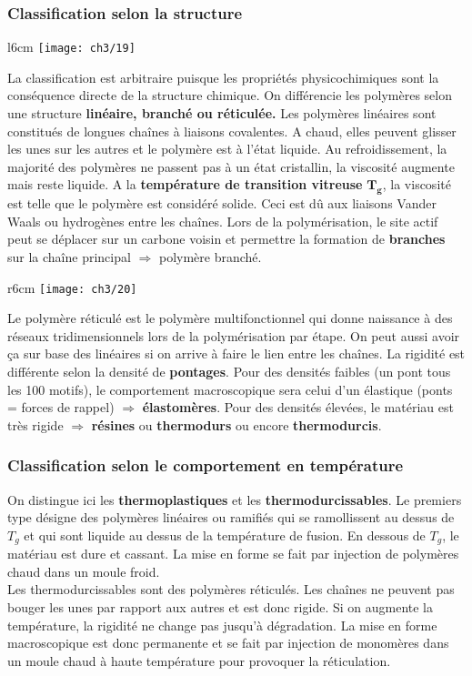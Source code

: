 	\subsubsection{Classification selon la structure}
	\begin{wrapfigure}[8]{l}{6cm}
			\vspace{-5mm}
			\texttt{[image: ch3/19]}
			\end{wrapfigure}	
	La classification est arbitraire puisque les propriétés physicochimiques sont la conséquence directe de la structure chimique. On différencie les polymères selon une structure \textbf{linéaire, branché ou réticulée.} Les polymères linéaires sont constitués de longues chaînes à liaisons covalentes. A chaud, elles peuvent glisser les unes sur les autres et le polymère est à l'état liquide. Au refroidissement, la majorité des polymères ne passent pas à un état cristallin, la viscosité augmente mais reste liquide. A la \textbf{température de transition vitreuse} $\mathbf{T_g}$, la viscosité est telle que le polymère est considéré solide. Ceci est dû aux liaisons Vander Waals ou hydrogènes entre les chaînes.
	Lors de la polymérisation, le site actif peut se déplacer sur un carbone voisin et permettre la formation de \textbf{branches} sur la chaîne principal $\Rightarrow$ polymère branché. 
	
	\begin{wrapfigure}[8]{r}{6cm}
			\vspace{-10mm}
			\texttt{[image: ch3/20]}
			\end{wrapfigure}	
			Le polymère réticulé est le polymère multifonctionnel qui donne naissance à des réseaux tridimensionnels lors de la polymérisation par étape. On peut aussi avoir ça sur base des linéaires si on arrive à faire le lien entre les chaînes. La rigidité est différente selon la densité de \textbf{pontages}. Pour des densités faibles (un pont tous les 100 motifs), le comportement macroscopique sera celui d'un élastique (ponts = forces de rappel) $\Rightarrow$ \textbf{élastomères}. Pour des densités élevées, le matériau est très rigide $\Rightarrow$  \textbf{résines} ou \textbf{thermodurs} ou encore \textbf{thermodurcis}. 
	
	\subsubsection{Classification selon le comportement en température}
		On distingue ici les \textbf{thermoplastiques} et les \textbf{thermodurcissables}. Le premiers type désigne des polymères linéaires ou ramifiés qui se ramollissent au dessus de $T_g$ et qui sont liquide au dessus de la température de fusion. En dessous de $T_g$, le matériau est dure et cassant. La mise en forme se fait par injection de polymères chaud dans un moule froid.  \\
		Les thermodurcissables sont des polymères réticulés. Les chaînes ne peuvent pas bouger les unes par rapport aux autres et est donc rigide. Si on augmente la température, la rigidité ne change pas jusqu'à dégradation. La mise en forme macroscopique est donc permanente et se fait par injection de monomères dans un moule chaud à haute température pour provoquer la réticulation. 
		
